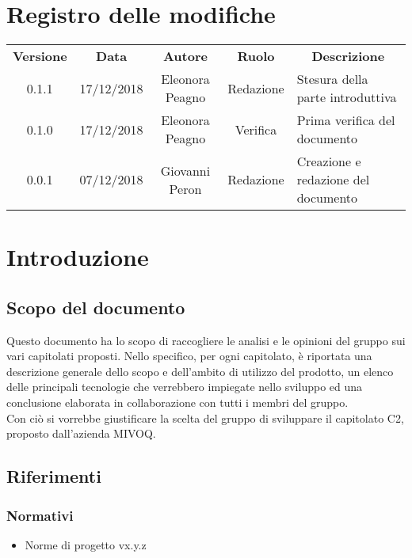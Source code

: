 \documentclass[11pt,a4paper]{article}
\begin{document}
	
	\tableofcontents
	\newpage
	\section*{\centering Registro delle modifiche}
	\begin{tabularx}{\textwidth}{ c | c | c | c | X }
		\rowcolor{LightBlue}
		\color{white}\bfseries Versione & \color{white}\bfseries Data & \color{white}\bfseries Autore & \color{white}\bfseries Ruolo & \multicolumn{1}{c}{\color{white}\bfseries Descrizione}\\[0.25cm]
		0.1.1 & 17/12/2018 & Eleonora Peagno & Redazione & Stesura della parte introduttiva \\
		0.1.0 & 17/12/2018 & Eleonora Peagno & Verifica & Prima verifica del documento \\
		0.0.1 & 07/12/2018 & Giovanni Peron & Redazione & Creazione e redazione del documento
		
	\end{tabularx}
	\newpage
	\section{Introduzione}
	\subsection{Scopo del documento}
	Questo documento ha lo scopo di raccogliere le analisi e le opinioni del gruppo sui vari capitolati proposti. Nello specifico, per ogni capitolato, è riportata una descrizione generale dello scopo e dell'ambito di utilizzo del prodotto, un elenco delle principali tecnologie che verrebbero impiegate nello sviluppo ed una conclusione elaborata in collaborazione con tutti i membri del gruppo.\\
Con ciò si vorrebbe giustificare la scelta del gruppo di sviluppare il capitolato C2, proposto dall'azienda MIVOQ.
	\subsection{Riferimenti}
		\subsubsection{Normativi}
		\begin{itemize}
		\item Norme di progetto vx.y.z
		\end{itemize}
\end{document}
